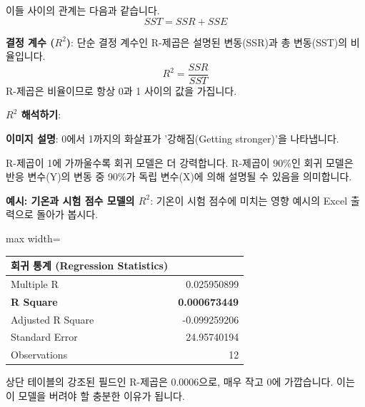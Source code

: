 \documentclass[11pt,a4paper]{article}
\theoremstyle{definition}
\begin{document}
\begin{tcolorbox}[infobox, title=모델의 유의성 평가 (Assessing Significance of Model)]
이들 사이의 관계는 다음과 같습니다.
\begin{equation*}
SST = SSR + SSE
\end{equation*}

\textbf{결정 계수 ($R^2$)}:
단순 결정 계수인 R-제곱은 설명된 변동(SSR)과 총 변동(SST)의 비율입니다.
\begin{equation*}
R^2 = \frac{SSR}{SST}
\end{equation*}
R-제곱은 비율이므로 항상 0과 1 사이의 값을 가집니다.

\textbf{$R^2$ 해석하기}:
\begin{center}
\end{center}
\textbf{이미지 설명}: 0에서 1까지의 화살표가 '강해짐(Getting stronger)'을 나타냅니다.

R-제곱이 1에 가까울수록 회귀 모델은 더 강력합니다. R-제곱이 90\%인 회귀 모델은 반응 변수(Y)의 변동 중 90\%가 독립 변수(X)에 의해 설명될 수 있음을 의미합니다.

\textbf{예시: 기온과 시험 점수 모델의 $R^2$}:
기온이 시험 점수에 미치는 영향 예시의 Excel 출력으로 돌아가 봅시다.
\begin{adjustbox}{max width=\textwidth}
\begin{tabular}{lr}
\toprule
\textbf{회귀 통계 (Regression Statistics)} & \\
\midrule
Multiple R & 0.025950899 \\
\textbf{R Square} & \textbf{0.000673449} \\
Adjusted R Square & -0.099259206 \\
Standard Error & 24.95740194 \\
Observations & 12 \\
\bottomrule
\end{tabular}
\end{adjustbox}
상단 테이블의 강조된 필드인 R-제곱은 0.0006으로, 매우 작고 0에 가깝습니다. 이는 이 모델을 버려야 할 충분한 이유가 됩니다.


\end{tcolorbox}
\end{document}
